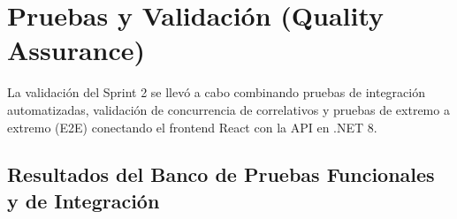 \documentclass[a4paper,12pt]{article}
\newcommand{\dotnet}{\mbox{.NET}}
\begin{document}
\section{Pruebas y Validación (Quality Assurance)}

La validación del Sprint 2 se llevó a cabo combinando pruebas de integración automatizadas, validación de concurrencia de correlativos y pruebas de extremo a extremo (E2E) conectando el frontend React con la API en \dotnet{} 8.

\subsection{Resultados del Banco de Pruebas Funcionales y de Integración}
\end{document}
